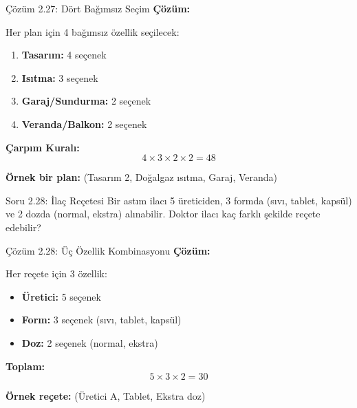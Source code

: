 \documentclass[light]{lutbeamer}
\begin{document}
\begin{frame}{Çözüm 2.27: Dört Bağımsız Seçim}
    \color{blue}
    \textbf{Çözüm:}
    
    Her plan için 4 bağımsız özellik seçilecek:
    \begin{enumerate}
        \item \textbf{Tasarım:} 4 seçenek
        \item \textbf{Isıtma:} 3 seçenek
        \item \textbf{Garaj/Sundurma:} 2 seçenek
        \item \textbf{Veranda/Balkon:} 2 seçenek
    \end{enumerate}
    
    \vspace{0.3cm}
    \textbf{Çarpım Kuralı:}
    \[ 4 \times 3 \times 2 \times 2 = 48 \]
    
    \vspace{0.3cm}
    \textbf{Örnek bir plan:} (Tasarım 2, Doğalgaz ısıtma, Garaj, Veranda)
    
    \begin{center}
    \end{center}
\end{frame}

\begin{frame}{Soru 2.28: İlaç Reçetesi}
    Bir astım ilacı 5 üreticiden, 3 formda (sıvı, tablet, kapsül) ve 2 dozda (normal, ekstra) alınabilir. Doktor ilacı kaç farklı şekilde reçete edebilir?
\end{frame}

\begin{frame}{Çözüm 2.28: Üç Özellik Kombinasyonu}
    \color{blue}
    \textbf{Çözüm:}
    
    Her reçete için 3 özellik:
    \begin{itemize}
        \item \textbf{Üretici:} 5 seçenek
        \item \textbf{Form:} 3 seçenek (sıvı, tablet, kapsül)
        \item \textbf{Doz:} 2 seçenek (normal, ekstra)
    \end{itemize}
    
    \vspace{0.3cm}
    \textbf{Toplam:}
    \[ 5 \times 3 \times 2 = 30 \]
    
    \vspace{0.3cm}
    \textbf{Örnek reçete:} (Üretici A, Tablet, Ekstra doz)
    
    \begin{center}
    \end{center}
\end{frame}
\end{document}
